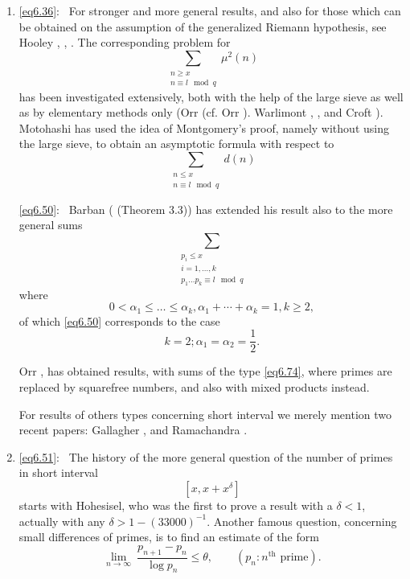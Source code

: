 \begin{enumerate}[{\bf 1.:}]
\item
\eqref{eq6.36}:~ For stronger and more general results, and also for
those which can be obtained on the assumption of the generalized
Riemann hypothesis, see Hooley \cite{key5}, \cite{key7},
\cite{key9}. The corresponding problem for  
\begin{equation*}
\sum _{\substack {n \geq x \\ {n \equiv l \mod q}}} \mu^2 (n)
\tag{6.72}\label{eq6.72} 
\end{equation*}\pageoriginale
has been investigated extensively, both with the help of the large
sieve as well as by elementary methods only (Orr \cite{key1} (cf. Orr
\cite{key2}). Warlimont \cite{key1}, \cite{key2}, and Croft
\cite{key1}). Motohashi \cite{key6}  has 
used the idea of Montgomery's proof, namely without using the large
sieve, to obtain an asymptotic formula with respect to  
\begin{equation*}
\sum_{\substack{n \leq x \\ {n \equiv l \mod q}}} d(n)
\tag{6.73}\label{eq6.73} 
\end{equation*}

\eqref{eq6.50}:~ Barban (\cite{key10} (Theorem 3.3)) has extended his
result also to the more general sums 
\begin{equation*}
\sum_{\substack {p_i \leq x\\ {i = 1, \ldots ,k}\\ {p_1 \ldots p_k
      \equiv l \mod q}}} \tag{6.74}\label{eq6.74} 
\end{equation*}
where
\begin{equation*}
0 < \alpha_1 \leq \ldots \leq  \alpha_k, \alpha_1 + \cdots +\alpha_k = 1,
k\geq 2, \tag{6.75} \label{eq6.75} 
\end{equation*}
of which \eqref{eq6.50} corresponds to the case 
\begin{equation*}
k = 2; \alpha_1 = \alpha_2 = \frac{1}{2}. \tag{6.76}\label{eq6.76}
\end{equation*}

Orr \cite{key1}, \cite{key2} has obtained results, with sums of the
type \eqref{eq6.74}, 
where primes are replaced by squarefree numbers, and also  with mixed
products instead. 

For results of others types concerning short interval we merely
mention two recent papers: Gallagher \cite{key5}, and Ramachandra
\cite{key10}.  

\item
\eqref{eq6.51}:~ The history of the more general question of the
number of primes in short interval\pageoriginale
$$
[x, x+x^\delta]
$$
starts with Hohesisel, who was the first to prove a result with a
$\delta < 1$, actually with any $\delta > 1-(33000)^{-1}$. Another
famous question, concerning small differences of primes, is to find
an estimate of the form 
\begin{equation*}
\lim_{n \to \infty} ~ \frac{p_{n+1}-p_n}{\log p_n}\leq \theta , \qquad
(p_n:n^{\text{th}} \text{ prime}). \tag{6.77}\label{eq6.77} 
\end{equation*} 
\end{enumerate} 

